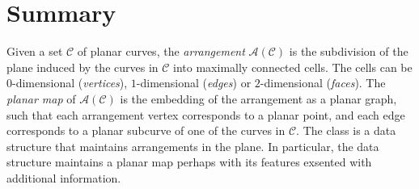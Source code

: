 \section*{Summary}
\label{arr_ref_sec:intro}
Given a set $\mathcal{C}$ of planar curves, the {\em arrangement}
${\mathcal A}({\mathcal C})$ is the subdivision of the plane induced
by the curves in $\mathcal{C}$ into maximally connected cells. The cells
can be $0$-dimensional ({\em vertices}), $1$-dimensional ({\em edges})
or $2$-dimensional ({\em faces}). The {\em planar map} of ${\mathcal
A}({\mathcal C})$ is the embedding of the arrangement as a planar
graph, such that each arrangement vertex corresponds to a planar
point, and each edge corresponds to a planar subcurve of one of the
curves in ${\mathcal C}$.
The class  is a data structure that maintains
arrangements in the plane. In particular, the data structure maintains a
planar map perhaps with its features exsented with additional information.
